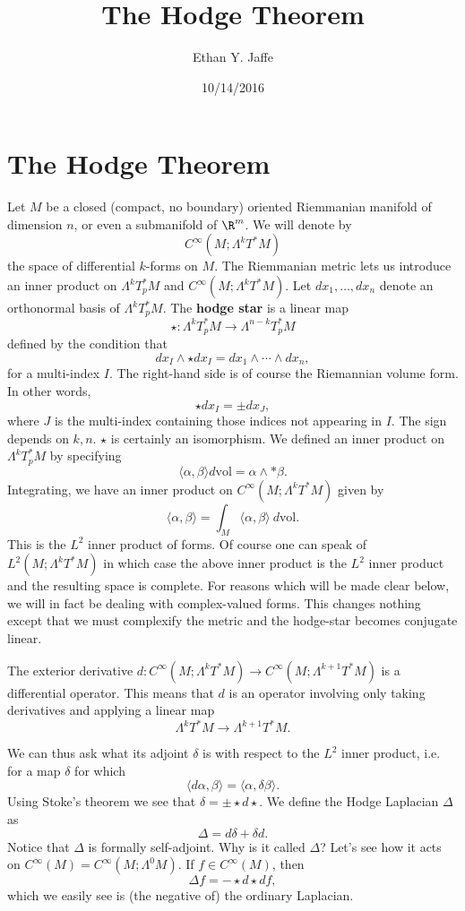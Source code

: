 \documentclass[12pt]{article}
\title{The Hodge Theorem}
\author{Ethan Y. Jaffe}
\date{10/14/2016}
\begin{document}
\maketitle
{}
\section{The Hodge Theorem}
Let $M$ be a closed (compact, no boundary) oriented Riemmanian manifold of dimension $n$, or even a submanifold of $\R^m$. We will denote by
\[C^\infty(M;\Lambda^kT^\ast M)\] the space of differential $k$-forms on $M$. The Riemmanian metric lets us introduce an inner product on $\Lambda^kT^\ast_pM$ and $C^\infty(M;\Lambda^k T^\ast M)$. Let $dx_1,\ldots,dx_n$ denote an orthonormal basis of $\Lambda^kT^\ast_p M$. The \textbf{hodge star} is a linear map
\[\star:\Lambda^k T_p^\ast M \to \Lambda^{n-k} T_p^\ast M\] defined by the condition that
\[dx_I \wedge \star dx_I = dx_1\wedge\cdots\wedge dx_n,\] for a multi-index $I$. The right-hand side is of course the Riemannian volume form. In other words,
\[\star dx_I = \pm dx_J,\] where $J$ is the multi-index containing those indices not appearing in $I$. The sign depends on $k,n$. $\star$ is certainly an isomorphism. We defined an inner product on $\Lambda^k T^\ast_p M$ by specifying
\[\langle \alpha,\beta\rangle d\text{vol} = \alpha\wedge \ast\beta.\] Integrating, we have an inner product on $C^\infty(M;\Lambda^kT^\ast M)$ given by
\[\langle \alpha,\beta\rangle = \int_M \langle \alpha,\beta\rangle\ d\text{vol}.\] This is the $L^2$ inner product of forms. Of course one can speak of $L^2(M;\Lambda^k T^\ast M)$ in which case the above inner product is the $L^2$ inner product and the resulting space is complete. For reasons which will be made clear below, we will in fact be dealing with complex-valued forms. This changes nothing except that we must complexify the metric and the hodge-star becomes conjugate linear.

The exterior derivative $d:C^\infty(M;\Lambda^k T^\ast M) \to C^\infty(M;\Lambda^{k+1} T^\ast M)$ is a differential operator. This means that $d$ is an operator involving only taking derivatives and applying a linear map \[\Lambda^k T^\ast M \to \Lambda^{k+1} T^\ast M.\]

We can thus ask what its adjoint $\delta$ is with respect to the $L^2$ inner product, i.e. for a map $\delta$ for which
\[\langle d \alpha,\beta\rangle = \langle \alpha,\delta\beta\rangle.\] Using Stoke's theorem we see that $\delta = \pm \star d \star$. We define the Hodge Laplacian $\Delta$ as
\[\Delta = d\delta + \delta d.\] Notice that $\Delta$ is formally self-adjoint. Why is it called $\Delta$? Let's see how it acts on $C^\infty(M) = C^\infty(M;\Lambda^0 M)$. If $f \in C^\infty(M)$, then
\[\Delta f = -\star d \star d f,\] which we easily see is (the negative of) the ordinary Laplacian.
\end{document}
